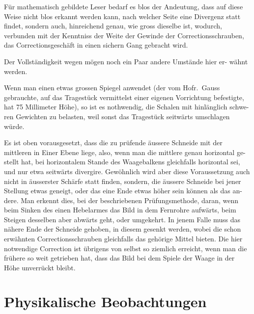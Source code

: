 \documentclass[12pt,a4paper]{article}
\begin{document}
Für mathematisch gebildete Leser bedarf es blos der Andeutung, dass auf 
diese Weise nicht blos erkannt werden kann, nach welcher Seite eine Divergenz 
statt findet, sondern auch, hinreichend genau, wie gross dieselbe ist, wodurch, 
verbunden mit der Kenntniss der Weite der Gewinde der Correctionsschrauben, 
das Correctionsgeschäft in einen sichern Gang gebracht wird.

Der Vollständigkeit wegen mögen noch ein Paar andere Umstände hier er-
wähnt werden.

Wenn man einen etwas grossen Spiegel anwendet (der vom Hofr.\ Gauss 
gebrauchte, auf das Tragestück vermittelst einer eigenen Vorrichtung befestigte, 
hat 75 Millimeter Höhe), so ist es nothwendig, die Schalen mit hinlänglich schwe-
ren Gewichten zu belasten, weil sonst das Tragestück seitwärts umschlagen würde.

Es ist oben vorausgesetzt, dass die zu prüfende äussere Schneide mit der 
mittleren in Einer Ebene liege, also, wenn man die mittlere genau horizontal ge-
stellt hat, bei horizontalem Stande des Waagebalkens gleichfalls horizontal sei, 
und nur etwa seitwärts divergire. Gewöhnlich wird aber diese Voraussetzung auch 
nicht in äusserster Schärfe statt finden, sondern, die äussere Schneide bei jener 
Stellung etwas geneigt, oder das eine Ende etwas höher sein können als das an-
dere. Man erkennt dies, bei der beschriebenen Prüfungsmethode, daran, wenn 
beim Sinken des einen Hebelarmes das Bild in dem Fernrohre aufwärts, beim 
Steigen desselben aber abwärts geht, oder umgekehrt. In jenem Falle muss das 
nähere Ende der Schneide gehoben, in diesem gesenkt werden, wobei die schon 
erwähnten Correctionsschrauben gleichfalls das gehörige Mittel bieten. Die hier 
notwendige Correction ist übrigens von selbst so ziemlich erreicht, wenn man die 
frühere so weit getrieben hat, dass das Bild bei dem Spiele der Waage in der 
Höhe unverrückt bleibt.

\newpage
\section*{Physikalische Beobachtungen}

\begin{center}
\end{center}
\end{document}

